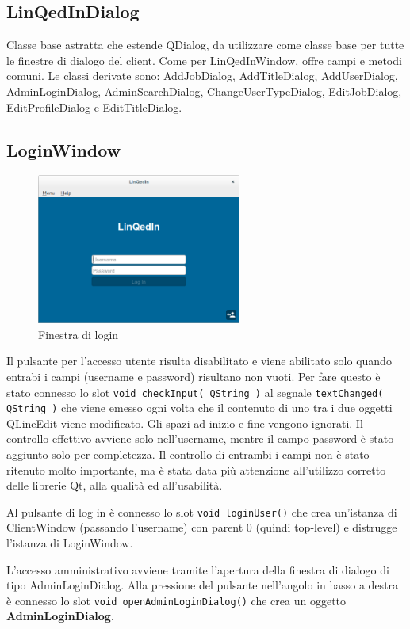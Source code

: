 \documentclass[a4paper,10pt]{article}
\begin{document}
\subsection*{LinQedInDialog}
Classe base astratta che estende QDialog, da utilizzare come classe base per tutte le finestre di dialogo del client. Come per LinQedInWindow, offre campi e metodi comuni. Le classi derivate sono: AddJobDialog, AddTitleDialog, AddUserDialog, AdminLoginDialog, AdminSearchDialog, ChangeUserTypeDialog, EditJobDialog, EditProfileDialog e EditTitleDialog.

\subsection*{LoginWindow}
\begin{figure}[!ht]
\centering
\includegraphics[width=0.6\textwidth]{LoginWindow.png}
\caption{Finestra di login}
\end{figure}

Il pulsante per l'accesso utente risulta disabilitato e viene abilitato solo quando entrabi i campi (username e password) risultano non vuoti. Per fare questo è stato connesso lo slot \texttt{void checkInput( QString )} al segnale \texttt{textChanged( QString )} che viene emesso ogni volta che il contenuto di uno tra i due oggetti QLineEdit viene modificato. Gli spazi ad inizio e fine vengono ignorati. Il controllo effettivo avviene solo nell'username, mentre il campo password è stato aggiunto solo per completezza. Il controllo di entrambi i campi non è stato ritenuto molto importante, ma è stata data più attenzione all'utilizzo corretto delle librerie Qt, alla qualità ed all'usabilità.

Al pulsante di log in è connesso lo slot \texttt{void loginUser()} che crea un'istanza di ClientWindow (passando l'username) con parent 0 (quindi top-level) e distrugge l'istanza di LoginWindow.

L'accesso amministrativo avviene tramite l'apertura della finestra di dialogo di tipo AdminLoginDialog. Alla pressione del pulsante nell'angolo in basso a destra è connesso lo slot \texttt{void openAdminLoginDialog()} che crea un oggetto \textbf{AdminLoginDialog}.
\end{document}
